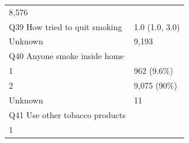 \documentclass[]{article}
\begin{document}
\begin{longtable}[]{@{}ll@{}}
\begin{minipage}[t]{0.23\columnwidth}
8,576\strut
\end{minipage}\tabularnewline
\begin{minipage}[t]{0.71\columnwidth}\raggedright
Q39 How tried to quit smoking\strut
\end{minipage} & \begin{minipage}[t]{0.23\columnwidth}\raggedright
1.0 (1.0, 3.0)\strut
\end{minipage}\tabularnewline
\begin{minipage}[t]{0.71\columnwidth}\raggedright
Unknown\strut
\end{minipage} & \begin{minipage}[t]{0.23\columnwidth}\raggedright
9,193\strut
\end{minipage}\tabularnewline
\begin{minipage}[t]{0.71\columnwidth}\raggedright
Q40 Anyone smoke inside home\strut
\end{minipage} & \begin{minipage}[t]{0.23\columnwidth}\raggedright
\strut
\end{minipage}\tabularnewline
\begin{minipage}[t]{0.71\columnwidth}\raggedright
1\strut
\end{minipage} & \begin{minipage}[t]{0.23\columnwidth}\raggedright
962 (9.6\%)\strut
\end{minipage}\tabularnewline
\begin{minipage}[t]{0.71\columnwidth}\raggedright
2\strut
\end{minipage} & \begin{minipage}[t]{0.23\columnwidth}\raggedright
9,075 (90\%)\strut
\end{minipage}\tabularnewline
\begin{minipage}[t]{0.71\columnwidth}\raggedright
Unknown\strut
\end{minipage} & \begin{minipage}[t]{0.23\columnwidth}\raggedright
11\strut
\end{minipage}\tabularnewline
\begin{minipage}[t]{0.71\columnwidth}\raggedright
Q41 Use other tobacco products\strut
\end{minipage} & \begin{minipage}[t]{0.23\columnwidth}\raggedright
\strut
\end{minipage}\tabularnewline
\begin{minipage}[t]{0.71\columnwidth}\raggedright
1\strut
\end{minipage} & \begin{minipage}[t]{0.23\columnwidth}\raggedright

\end{minipage}
\end{longtable}
\end{document}

